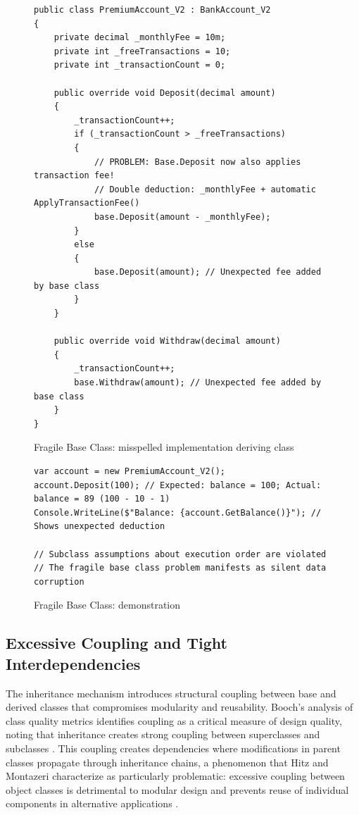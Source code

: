 \begin{figure}
    \centering
    \begin{verbatim}
public class PremiumAccount_V2 : BankAccount_V2
{
    private decimal _monthlyFee = 10m;
    private int _freeTransactions = 10;
    private int _transactionCount = 0;
    
    public override void Deposit(decimal amount)
    {
        _transactionCount++;
        if (_transactionCount > _freeTransactions)
        {
            // PROBLEM: Base.Deposit now also applies transaction fee!
            // Double deduction: _monthlyFee + automatic ApplyTransactionFee()
            base.Deposit(amount - _monthlyFee);
        }
        else
        {
            base.Deposit(amount); // Unexpected fee added by base class
        }
    }
    
    public override void Withdraw(decimal amount)
    {
        _transactionCount++;
        base.Withdraw(amount); // Unexpected fee added by base class
    }
}
    \end{verbatim}
    \caption{Fragile Base Class: misspelled implementation deriving class}
    \label{fig:fragile-base-class-misspelled-implementation-deriving-class}
\end{figure}

\begin{figure}
    \centering
    \begin{verbatim}
var account = new PremiumAccount_V2();
account.Deposit(100); // Expected: balance = 100; Actual: balance = 89 (100 - 10 - 1)
Console.WriteLine($"Balance: {account.GetBalance()}"); // Shows unexpected deduction

// Subclass assumptions about execution order are violated
// The fragile base class problem manifests as silent data corruption
    \end{verbatim}
    \caption{Fragile Base Class: demonstration}
    \label{fig:fragile-base-class-demonstration}
\end{figure}


\subsection{Excessive Coupling and Tight Interdependencies}

The inheritance mechanism introduces structural coupling between base and derived classes that compromises modularity and reusability. Booch's analysis of class quality metrics identifies coupling as a critical measure of design quality, noting that inheritance creates strong coupling between superclasses and subclasses \cite{booch2008object}. This coupling creates dependencies where modifications in parent classes propagate through inheritance chains, a phenomenon that Hitz and Montazeri characterize as particularly problematic: excessive coupling between object classes is detrimental to modular design and prevents reuse of individual components in alternative applications \cite{hitz1995measuring}.

